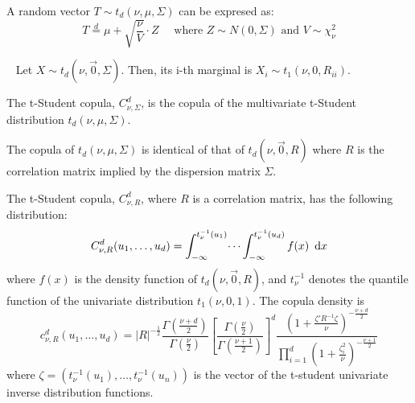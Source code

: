 \documentclass[11pt,fleqn]{book} %
\begin{document}
\begin{proposition}
	\label{prop:mtschar}
	A random vector $T \sim t_d(\nu,\mu,\Sigma)$ can be expresed as:
	\begin{displaymath}
		T \stackrel{d}{=} \mu + \sqrt{\frac{\nu}{V}}\cdot Z
		\quad \text{ where } Z \sim N(0,\Sigma) \text{ and } V \sim \chi_{\nu}^2
	\end{displaymath}
\end{proposition}

\begin{proposition}~\cite{kotz:2004}
	Let $X \sim t_d(\nu,\vec{0},\Sigma)$. Then, its i-th marginal is 
	$X_i \sim t_1(\nu,0,R_{ii})$.
\end{proposition}

\begin{definition}
	The t-Student copula, $C_{\nu,\Sigma}^d$, is the copula of the multivariate 
	t-Student distribution $t_d(\nu,\mu,\Sigma)$.
\end{definition}

\begin{proposition}
	The copula of $t_d(\nu,\mu,\Sigma)$ is identical of that of $t_d(\nu,\vec{0},R)$
	where $R$ is the correlation matrix implied by the dispersion matrix $\Sigma$.
\end{proposition}

\begin{proposition}
	The t-Student copula, $C_{\nu,R}^d$, where $R$ is a correlation matrix,
	has the following distribution:
	\begin{displaymath}
		C_{\nu,R}^d(u_1, \dots, u_d) = 
		\int_{-\infty}^{t_\nu^{-1}(u_1)} \dots \int_{-\infty}^{t_\nu^{-1}(u_d)} f(x)\ \mathop{\mathrm{{}d}}\mathopen{} x
	\end{displaymath}
	where $f(x)$ is the density function of $t_d(\nu,\vec{0},R)$, and $t_{\nu}^{-1}$ 
	denotes the quantile function of the univariate distribution $t_1(\nu,0,1)$. 
	The copula density is
	\begin{displaymath}
		\label{eq:density}
		c_{\nu,R}^d(u_1,\dots,u_d) =
		|R|^{-\frac{1}{2}} 
		\displaystyle\frac{\Gamma{\left(\frac{\nu+d}{2}\right)}}{\Gamma{\left(\frac{\nu}{2}\right)}}
		\displaystyle\left[ \frac{\Gamma{\left(\frac{\nu}{2}\right)}}{\Gamma{\left(\frac{\nu+1}{2}\right)}} \right]^d
		\frac{\displaystyle\left( 1+\frac{\zeta' R^{-1} \zeta}{\nu}\right)^{-\frac{\nu+d}{2}}}{\displaystyle\prod_{i=1}^d \left( 1+\frac{\zeta_i^2}{\nu} \right)^{-\frac{\nu+1}{2}}}
	\end{displaymath}
	\noindent
	where $\zeta=(t_\nu^{-1}(u_1), \dots, t_\nu^{-1}(u_n))$ is the vector of 
	the t-student univariate inverse distribution functions.
\end{proposition}
\end{document}
